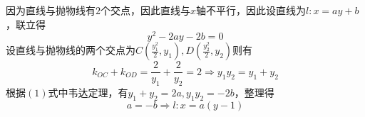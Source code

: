 因为直线与抛物线有$2$个交点，因此直线与$x$轴不平行，因此设直线为$l:x = ay + b$，联立得
\begin{equation}
{y^2} - 2ay - 2b = 0
\end{equation}
设直线与抛物线的两个交点为$C\left( {\frac{{y_1^2}}{2},{y_1}} \right),D\left( {\frac{{y_2^2}}{2},{y_2}} \right)$则有
\begin{equation}
{k_{OC}} + {k_{OD}} = \frac{2}{{{y_1}}} + \frac{2}{{{y_2}}} = 2 \Rightarrow {y_1}{y_2} = {y_1} + {y_2}
\end{equation}
根据$(1)$式中韦达定理，有${y_1} + {y_2} = 2a,{y_1}{y_2} =  - 2b$，整理得
\begin{equation}
a =  - b \Rightarrow l:x = a\left( {y - 1} \right)
\end{equation}